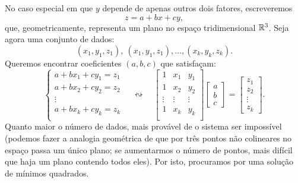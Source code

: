 \documentclass[../livro.tex]{subfiles}  %
\begin{document}
No caso especial em que $y$ depende de apenas outros dois fatores, escreveremos
\begin{equation}
z = a + b x + c y,
\end{equation} que, geometricamente, representa um plano no espaço tridimensional $\mathbb{R}^3$. Seja agora uma conjunto de dados:
\begin{equation}
(x_1, y_1, z_1), \ (x_1, y_1, z_1), \dots, (x_k, y_k, z_k).
\end{equation} Queremos encontrar coeficientes $(a,b,c)$ que satisfaçam:
\begin{equation}
\left\{
  \begin{array}{c}
    a + b x_1 + c y_1 = z_1 \\
    a + b x_2 + c y_2 = z_2 \\
    \vdots \\
    a + b x_k + c y_k = z_k \\
  \end{array}
\right. \quad \leftrightsquigarrow \quad
\begin{bmatrix}
  1 & x_1 & y_1 \\
  1 & x_2 & y_2 \\
  \vdots & \vdots & \vdots \\
  1 & x_k & y_k \\
\end{bmatrix}
\begin{bmatrix}
  a \\ b \\ c
\end{bmatrix} =
\begin{bmatrix}
  z_1 \\ z_2 \\ \vdots \\ z_k
\end{bmatrix}.
\end{equation} Quanto maior o número de dados, mais provável de o sistema ser impossível (podemos fazer a analogia geométrica de que por três pontos não colineares no espaço passa um único plano; se aumentarmos o número de pontos, mais difícil que haja um plano contendo todos eles). Por isto, procuramos por uma solução de mínimos quadrados.
\end{document}
